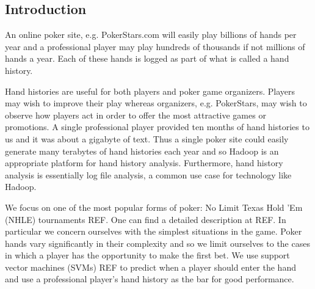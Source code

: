 \documentclass[twoside]{article}
\begin{document}
\begin{multicols}{2} %

\section{Introduction}
An online poker site, e.g. PokerStars.com will easily play billions of hands per year and a professional player may play hundreds of thousands if not millions of hands a year. Each of these hands is logged as part of what is called a hand history.

Hand histories are useful for both players and poker game organizers. Players may wish to improve their play whereas organizers, e.g. PokerStars, may wish to observe how players act in order to offer the most attractive games or promotions. A single professional player provided ten months of hand histories to us and it was about a gigabyte of text. Thus a single poker site could easily generate many terabytes of hand histories each year and so Hadoop is an appropriate platform for hand history analysis. Furthermore, hand history analysis is essentially log file analysis, a common use case for technology like Hadoop.

We focus on one of the most popular forms of poker: No Limit Texas Hold 'Em (NHLE) tournaments REF. One can find a detailed description at REF. In particular we concern ourselves with the simplest situations in the game. Poker hands vary significantly in their complexity and so we limit ourselves to the cases in which a player has the opportunity to make the first bet. We use support vector machines (SVMs) REF to predict when a player should enter the hand and use a professional player's hand history as the bar for good performance.



\end{multicols}
\end{document}
